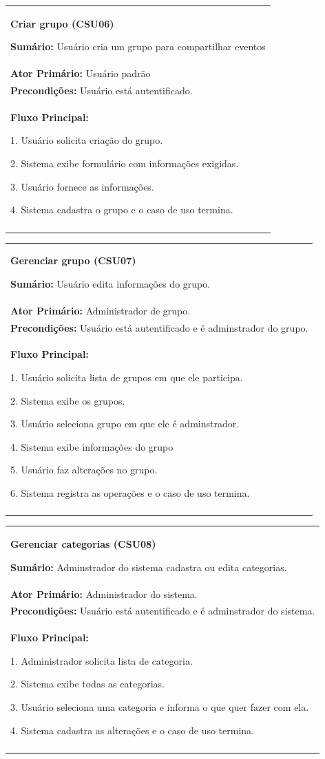 \documentclass{article}
\newcommand{\sumario}[1] {\textbf{Sumário:} #1\\ \medskip}
\newcommand{\ator}[1] {\textbf{Ator Primário:} #1\\ \medskip}
\newcommand{\precond}[1] {\textbf{Precondições:} #1\\ \medskip}
\newcommand{\fluxo}{\textbf{Fluxo Principal:} \medskip}
\newenvironment{boxed}[1]
    {
\begin{center}
    \begin{tabular}{|p{\textwidth}|}
    \hline
\begin{center}
	{\large \textbf{#1}}
\end{center}
    }
    { 
    \\\\\hline
    \end{tabular} 
    \end{center}
    }
\begin{document}
	\begin{boxed}{Criar grupo (CSU06)}
	\sumario{Usuário cria um grupo para compartilhar eventos}
 	\ator{Usuário padrão }
	 \precond{Usuário está autentificado.}
	\fluxo

	1. Usuário solicita criação do grupo.

	2. Sistema exibe formulário com informações exigidas.

	3. Usuário fornece as informações.

	4. Sistema cadastra o grupo e o caso de uso termina.

	\end{boxed}
	\begin{boxed}{Gerenciar grupo (CSU07)}
	
  	\sumario{Usuário edita informações do grupo.}
	
	 \ator{Administrador de grupo.}
	
	 \precond{Usuário está autentificado e é adminstrador do grupo.}
	
	\fluxo
	
	1. Usuário solicita lista de grupos em que ele participa.

	2. Sistema exibe os grupos.

	3. Usuário seleciona grupo em que ele é adminstrador.

	4.  Sistema exibe informações do grupo

	5. Usuário faz alterações no grupo.

	6. Sistema registra as operações e o caso de uso termina.

	\end{boxed}
	\begin{boxed}{Gerenciar categorias (CSU08)}
	
	\sumario{Adminstrador do sistema cadastra ou edita categorias.}
	
	\ator{Administrador do sistema.}
	
	\precond{Usuário está autentificado e é adminstrador do sistema.}
	
	\fluxo
	
	1. Administrador solicita lista de categoria.

	2. Sistema exibe todas as categorias.

	3. Usuário seleciona uma categoria e informa o que quer fazer com ela.

	4. Sistema cadastra as alterações e o caso de uso termina.

	\end{boxed}
\end{document}
